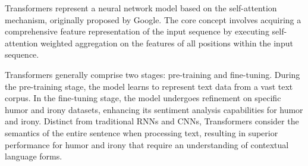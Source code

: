 \documentclass[a4paper]{article}
\begin{document}
Transformers represent a neural network model based on the self-attention mechanism, originally proposed by Google. The core concept involves acquiring a comprehensive feature representation of the input sequence by executing self-attention weighted aggregation on the features of all positions within the input sequence.

Transformers generally comprise two stages: pre-training and fine-tuning. During the pre-training stage, the model learns to represent text data from a vast text corpus. In the fine-tuning stage, the model undergoes refinement on specific humor and irony datasets, enhancing its sentiment analysis capabilities for humor and irony. Distinct from traditional RNNs and CNNs, Transformers consider the semantics of the entire sentence when processing text, resulting in superior performance for humor and irony that require an understanding of contextual language forms.
\end{document}
